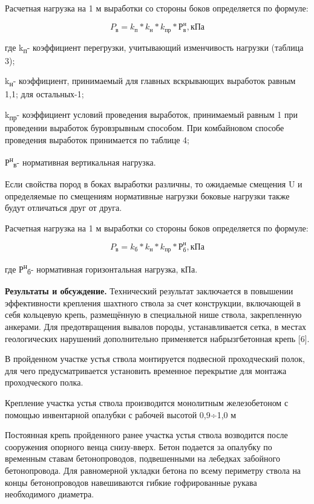 \begin{multicols}{2}
Расчетная нагрузка на 1 м выработки со стороны боков определяется по
формуле:

\begin{equation}
P_{\text{в}}=k_{\text{п}}  * k_{\text{н}}  * k_{\text{пр}}  * Р_{\text{в}}^{\text{н}}, \text{кПа}
\end{equation}

где k\textsubscript{п}- коэффициент перегрузки, учитывающий изменчивость
нагрузки (таблица 3);

k\textsubscript{н}- коэффициент, принимаемый для главных вскрывающих
выработок равным 1,1; для остальных-1;

k\textsubscript{пр}- коэффициент условий проведения выработок,
принимаемый равным 1 при проведении выработок буровзрывным способом. При
комбай­новом способе проведения выработок принимается по таблице 4;

Р\textsuperscript{н}\textsubscript{в}- нормативная вертикальная
нагрузка.

Если свойства пород в боках выработки различны, то ожидаемые смещения U
и определяемые по смещениям нормативные нагрузки боковые нагрузки также
будут отличаться друг от друга.

Расчетная нагрузка на 1 м выработки со стороны боков определяется по
формуле:

\begin{equation}
P_{\text{в}}=k_{\text{б}}  * k_{\text{н}}  * k_{\text{пр}}  * Р_{\text{б}}^{\text{н}}, \text{кПа}
\end{equation}

где Р\textsuperscript{н}\textsubscript{б}- нормативная горизонтальная
нагрузка, кПа.

{\bfseries Результаты и обсуждение.} Технический результат заключается в
повышении эффективности крепления шахтного ствола за счет конструкции,
включающей в себя кольцевую крепь, размещённую в специальной нише
ствола, закрепленную анкерами. Для предотвращения вывалов породы,
устанавливается сетка, в местах геологических нарушений дополнительно
применяется набрызгбетонная крепь {[}6{]}.

В пройденном участке устья ствола монтируется подвесной проходческий
полок, для чего предусматривается установить временное перекрытие для
монтажа проходческого полка.

Крепление участка устья ствола производится монолитным железобетоном с
помощью инвентарной опалубки с рабочей высотой 0,9÷1,0 м

Постоянная крепь пройденного ранее участка устья ствола возводится после
сооружения опорного венца снизу-вверх. Бетон подается за опалубку по
временным ставам бетонопроводов, подвешенными на лебедках забойного
бетонопровода. Для равномерной укладки бетона по всему периметру ствола
на концы бетонопроводов навешиваются гибкие гофрированные рукава
необходимого диаметра.


\end{multicols}

